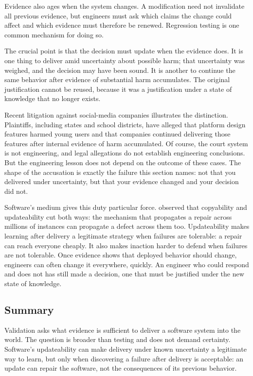 Evidence also ages when the system changes. A modification need not invalidate all previous
evidence, but engineers must ask which claims the change could affect and which evidence must
therefore be renewed. Regression testing is one common mechanism for doing so.

The crucial point is that the decision must update when the evidence does. It is one thing to
deliver amid uncertainty about possible harm; that uncertainty was weighed, and the decision may
have been sound. It is another to continue the same behavior after evidence of substantial harm
accumulates. The original justification cannot be reused, because it was a justification under a
state of knowledge that no longer exists.

Recent litigation against social-media companies illustrates the distinction. Plaintiffs,
including states and school districts, have alleged that platform design features harmed young
users and that companies continued delivering those features after internal evidence of harm
accumulated. Of course, the court system is not engineering, and legal allegations do not establish
engineering conclusions. But the engineering lesson does not depend on the outcome of these cases.
The shape of the accusation is exactly the failure this section names: not that you delivered under
uncertainty, but that your evidence changed and your decision did not.

Software's medium gives this duty particular force. \citet{ch-software-engineering} observed that
copyability and updateability cut both ways: the mechanism that propagates a repair across millions
of instances can propagate a defect across them too. Updateability makes learning after delivery a
legitimate strategy when failures are tolerable: a repair can reach everyone cheaply. It also makes
inaction harder to defend when failures are not tolerable. Once evidence shows that deployed
behavior should change, engineers can often change it everywhere, quickly. An engineer who could
respond and does not has still made a decision, one that must be justified under the new state of
knowledge.

\subsection{Summary}\label{summary}

Validation asks what evidence is sufficient to deliver a software system into the world. The
question is broader than testing and does not demand certainty. Software's updateability can make
delivery under known uncertainty a legitimate way to learn, but only when discovering a failure
after delivery is acceptable: an update can repair the software, not the consequences of its
previous behavior.

